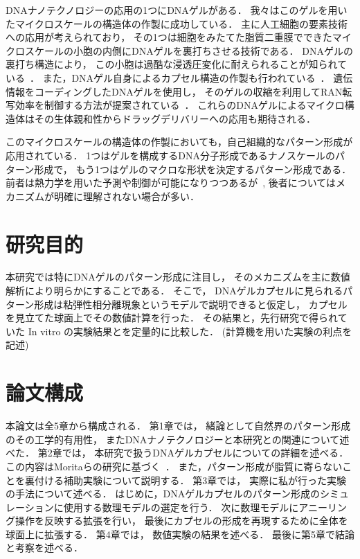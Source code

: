 DNAナノテクノロジーの応用の1つにDNAゲルがある．
我々はこのゲルを用いたマイクロスケールの構造体の作製に成功している．
主に人工細胞の要素技術への応用が考えられており，
その1つは細胞をみたてた脂質二重膜でできたマイクロスケールの小胞の内側にDNAゲルを裏打ちさせる技術である．
DNAゲルの裏打ち構造により，
この小胞は過酷な浸透圧変化に耐えられることが知られている~\cite{kurokawa2017dna}．
また，DNAゲル自身によるカプセル構造の作製も行われている~\cite{morita2017formation}．
遺伝情報をコーディングしたDNAゲルを使用し，
そのゲルの収縮を利用してRAN転写効率を制御する方法が提案されている~\cite{watanabe}．
これらのDNAゲルによるマイクロ構造体はその生体親和性からドラッグデリバリーへの応用も期待される．

このマイクロスケールの構造体の作製においても，自己組織的なパターン形成が応用されている．
1つはゲルを構成するDNA分子形成であるナノスケールのパターン形成で，
もう1つはゲルのマクロな形状を決定するパターン形成である．
前者は熱力学を用いた予測や制御が可能になりつつあるが~\cite{zadeh2011nupack}, 
後者についてはメカニズムが明確に理解されない場合が多い．


\section{研究目的}
本研究では特にDNAゲルのパターン形成に注目し，
そのメカニズムを主に数値解析により明らかにすることである．
そこで，
DNAゲルカプセルに見られるパターン形成は粘弾性相分離現象というモデルで説明できると仮定し，
カプセルを見立てた球面上でその数値計算を行った．
その結果と，先行研究で得られていた In vitro の実験結果とを定量的に比較した．
(計算機を用いた実験の利点を記述) %

\section{論文構成}
本論文は全5章から構成される．
第1章では，
緒論として自然界のパターン形成のその工学的有用性，
またDNAナノテクノロジーと本研究との関連について述べた．
第2章では，
本研究で扱うDNAゲルカプセルについての詳細を述べる．
この内容はMoritaらの研究に基づく~\cite{morita2017formation}．
また，パターン形成が脂質に寄らないことを裏付ける補助実験について説明する．
第3章では，
実際に私が行った実験の手法について述べる．
はじめに，DNAゲルカプセルのパターン形成のシミュレーションに使用する数理モデルの選定を行う．
次に数理モデルにアニーリング操作を反映する拡張を行い，
最後にカプセルの形成を再現するために全体を球面上に拡張する．
第4章では，
数値実験の結果を述べる．
最後に第5章で結論と考察を述べる．
